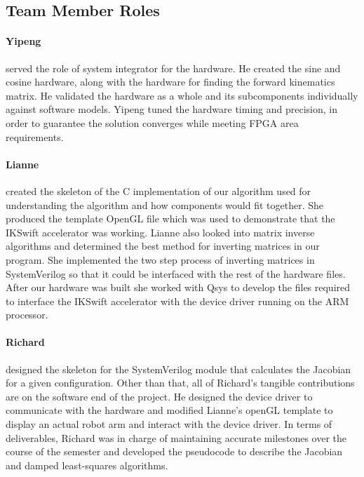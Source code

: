 \subsection{Team Member Roles}

\paragraph{Yipeng} served the role of system integrator for the hardware. He created the sine and cosine hardware, along with the hardware for finding the forward kinematics matrix. He validated the hardware as a whole and its subcomponents individually against software models. Yipeng tuned the hardware timing and precision, in order to guarantee the solution converges while meeting FPGA area requirements.

\paragraph{Lianne} created the skeleton of the C implementation of our algorithm used 
for understanding the algorithm and how components would fit together. She 
produced the template OpenGL file which was used to demonstrate that the 
IKSwift accelerator was working. Lianne also looked into matrix inverse 
algorithms and determined the best method for inverting matrices in our 
program. She implemented the two step process of inverting matrices in 
SystemVerilog so that it could be interfaced with the rest of the 
hardware files. After our hardware was built she worked with Qsys to 
develop the files required to interface the IKSwift accelerator with 
the device driver running on the ARM processor. 

\paragraph{Richard} designed the skeleton for the SystemVerilog module that calculates the Jacobian
for a given configuration. Other than that, all of Richard's tangible contributions are on the
software end of the project. He designed the device driver to communicate with the hardware and
modified Lianne's openGL template to display an actual robot arm and interact with the device
driver. In terms of deliverables, Richard was in charge of maintaining accurate milestones over the
course of the semester and developed the pseudocode to describe the Jacobian and
damped least-squares algorithms.